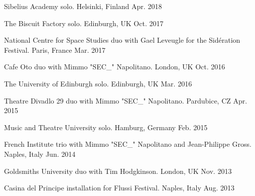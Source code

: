 \begin{cvhonors}
  \cvhonor
    {Sibelius Academy}
    {solo.}
    {Helsinki, Finland}
    {Apr. 2018} %

  \cvhonor
    {The Biscuit Factory}
    {solo.}
    {Edinburgh, UK}
    {Oct. 2017} %

  \cvhonor
    {National Centre for Space Studies}
    {duo with Gael Leveugle for the Sid\'eration Festival.}
    {Paris, France}
    {Mar. 2017} %

  \cvhonor
    {Cafe Oto}
    {duo with Mimmo "SEC\_" Napolitano.}
    {London, UK}
    {Oct. 2016} %

  \cvhonor
    {The University of Edinburgh}
    {solo.}
    {Edinburgh, UK}
    {Mar. 2016} %

  \cvhonor
    {Theatre Divadlo 29}
    {duo with Mimmo "SEC\_" Napolitano.}
    {Pardubice, CZ}
    {Apr. 2015} %

  \cvhonor
    {Music and Theatre University}
    {solo.}
    {Hamburg, Germany}
    {Feb. 2015} %

  \cvhonor
    {French Institute}
    {trio with Mimmo "SEC\_" Napolitano and Jean-Philippe Gross.}
    {Naples, Italy}
    {Jun. 2014} %

  \cvhonor
    {Goldsmiths University}
    {duo with Tim Hodgkinson.}
    {London, UK}
    {Nov. 2013} %

  \cvhonor
    {Casina del Principe}
    {installation for Flussi Festival.}
    {Naples, Italy}
    {Aug. 2013} %


\end{cvhonors}
